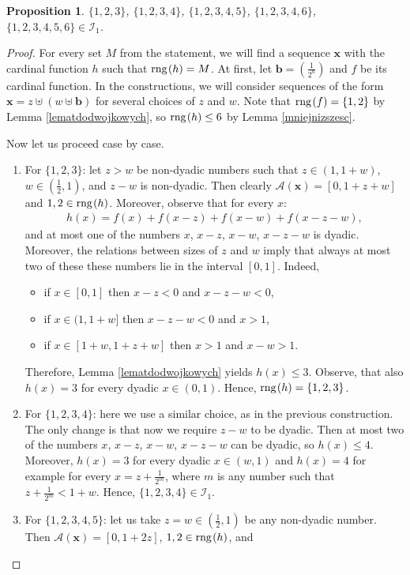 \documentclass{amsart}
\newtheorem{proposition}[theorem]{Proposition}
\theoremstyle{definition}
\newcommand{\rng}{{\rm rng} \hspace{0.03cm}}
\begin{document}
\begin{proposition}\label{PropSetsI_1}
$\{1,2,3\}$, $\{1,2,3,4\}$, $\{1,2,3,4,5\}$, $\{1,2,3,4,6\}$, $\{1,2,3,4,5,6\}\in\mathcal{I}_{1}$.
\end{proposition}
\begin{proof}
For every set $M$ from the statement, we will find a sequence $\mathbf{x}$ with the cardinal function $h$ such that $\rng (h)=M$. At first, let $\mathbf{b}= \left(\frac{1}{2^{n}}\right)$ and $f$ be its cardinal function. In the constructions, we will consider sequences of the form $\mathbf{x} = z\uplus (w\uplus \mathbf{b})$ for several choices of $z$ and $w$. Note that $\rng (f)=\{1,2\}$ by Lemma \ref{lematdodwojkowych}, so $\rng (h)\leq 6$ by Lemma \ref{mniejnizszesc}.

Now let us proceed case by case.
\begin{enumerate}
	\item For $\{1,2,3\}$: let $z>w$ be non-dyadic numbers such that $z\in (1,1+w)$, $w\in(\frac{1}{2},1)$, and $z-w$ is non-dyadic. Then clearly $\mathcal{A}(\mathbf{x}) = [0,1+z+w]$ and $1,2\in \rng (h)$. Moreover, observe that for every $x$:
	\begin{align*}
	h(x) = f(x) + f(x-z) + f(x-w) + f(x-z-w),
	\end{align*}		
	and at most one of the numbers $x$, $x-z$, $x-w$, $x-z-w$ is dyadic. Moreover, the relations between sizes of $z$ and $w$ imply that always at most two of these these numbers lie in the interval $[0,1]$. Indeed,
	\begin{itemize}
	\item if $x\in [0,1]$ then $x-z<0$ and $x-z-w<0$,
	\item if $x\in (1,1+w]$ then $x-z-w<0$ and $x>1$,
	\item if $x\in [1+w,1+z+w]$ then $x>1$ and $x-w>1$.
	\end{itemize}	
	 Therefore, Lemma \ref{lematdodwojkowych} yields $h(x)\leq 3$. Observe, that also $h(x)=3$ for every dyadic $x\in (0,1)$. Hence, $\rng (h)=\{1,2,3\}$.
	\item For $\{1,2,3,4\}$: here we use a similar choice, as in the previous construction. The only change is that now we require $z-w$ to be dyadic. Then at most two of the numbers $x$, $x-z$, $x-w$, $x-z-w$ can be dyadic, so $h(x)\leq 4$. Moreover, $h(x)=3$ for every dyadic $x\in (w,1)$ and $h(x)=4$ for example for every $x=z+\frac{1}{2^{m}}$, where $m$ is any number such that $z+\frac{1}{2^{m}} < 1+w$. Hence, $\{1,2,3,4\}\in\mathcal{I}_{1}$.
	\item For $\{1,2,3,4,5\}$: let us take $z=w\in (\frac{1}{2},1)$ be any non-dyadic number. Then $\mathcal{A}(\mathbf{x})=[0,1+2z]$, $1,2\in\rng (h)$, and

\end{enumerate}
\end{proof}
\end{document}
